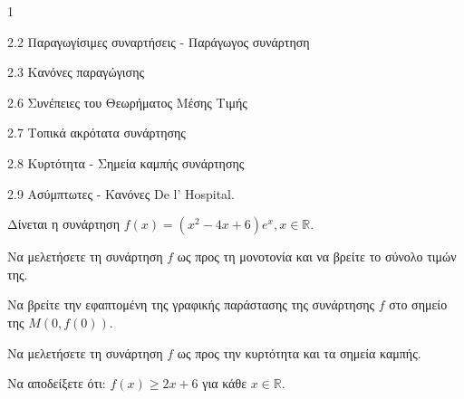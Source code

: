 \begin{ylh}{1}
    \item 2.2 Παραγωγίσιμες συναρτήσεις - Παράγωγος συνάρτηση
    \item 2.3 Κανόνες παραγώγισης
    \item 2.6 Συνέπειες του Θεωρήματος Μέσης Τιμής
    \item 2.7 Τοπικά ακρότατα συνάρτησης
    \item 2.8 Κυρτότητα - Σημεία καμπής συνάρτησης
    \item 2.9 Ασύμπτωτες - Κανόνες De l’ Hospital.
\end{ylh}
Δίνεται η συνάρτηση $f(x)=(x^2-4x+6)e^x, x \in \mathbb{R}$.
\begin{alist}
    \item Να μελετήσετε τη συνάρτηση $f$ ως προς τη μονοτονία και να βρείτε το σύνολο τιμών της. 
    \item Να βρείτε την εφαπτομένη της γραφικής παράστασης της συνάρτησης $f$ στο σημείο της $M(0, f(0))$. 
    \item Να μελετήσετε τη συνάρτηση $f$ ως προς την κυρτότητα και τα σημεία καμπής. 
    \item Να αποδείξετε ότι: $f(x) \ge 2x+6$ για κάθε $x \in \mathbb{R}$. 
\end{alist}